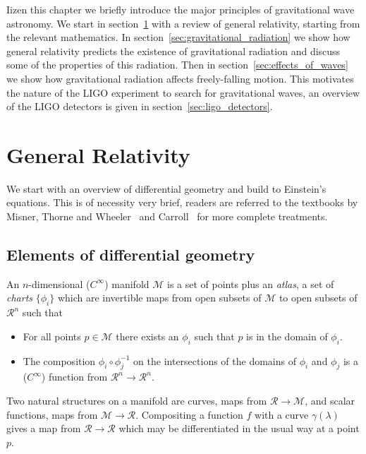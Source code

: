 Iizen this chapter we briefly introduce the major principles of
gravitational wave astronomy.  We start in
section~\ref{sec:general_relativity} with a review of general
relativity, starting from the relevant mathematics.  In
section~\ref{sec:gravitational_radiation} we show how general
relativity predicts the existence of gravitational radiation and
discuss some of the properties of this radiation.  Then in 
section~\ref{sec:effects_of_waves} we show how gravitational radiation
affects freely-falling motion.  This motivates the nature of the
LIGO experiment to search for gravitational waves, an overview of
the LIGO detectors is given in section~\ref{sec:ligo_detectors}.

\section{General Relativity}
\label{sec:general_relativity}

We start with an overview of differential geometry and build to
Einstein's equations.  This is of necessity very brief, readers are
referred to the textbooks by Misner, Thorne and Wheeler~\cite{MTW} and
Carroll~\cite{carrollTextbook} for more complete treatments.

\subsection{Elements of differential geometry}

An $n$-dimensional ($C^\infty$) manifold $\mathcal{M}$ is a set of
points plus an \emph{atlas}, a set of \emph{charts} $\{\phi_i\}$ which
are invertible maps from open subsets of $\mathcal{M}$ to open subsets
of $\mathcal{R}^n$ such that


\begin{itemize}
\item For all points $p \in \mathcal{M}$ there exists an $\phi_i$ 
such that $p$ is in the domain of $\phi_i$.
\item The composition $\phi_i \circ \phi_j^{-1}$ on the 
intersections of the domains of $\phi_i$ and $\phi_j$ is a
($C^\infty$) function from $\mathcal{R}^n \to \mathcal{R}^n$.
\end{itemize}

Two natural structures on a manifold are curves, maps from
$\mathcal{R}\to\mathcal{M}$, and scalar functions,  maps from
$\mathcal{M}\to\mathcal{R}$.  Compositing a function $f$ with a curve
$\gamma(\lambda)$ gives a map from $\mathcal{R} \rightarrow
\mathcal{R}$ which may be differentiated in the usual way at a point
$p$.

